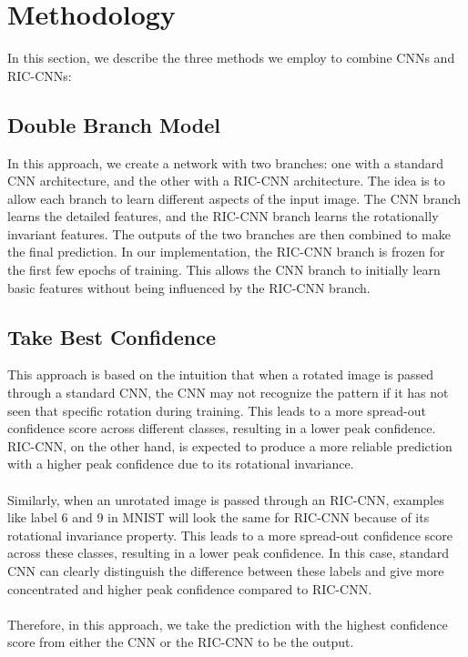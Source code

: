 \section{Methodology}
\label{sec:method}

In this section, we describe the three methods we employ to combine CNNs and RIC-CNNs:
\subsection{Double Branch Model}

In this approach, we create a network with two branches: one with a standard CNN architecture, and the other with a RIC-CNN architecture. The idea is to allow each branch to learn different aspects of the input image. The CNN branch learns the detailed features, and the RIC-CNN branch learns the rotationally invariant features. The outputs of the two branches are then combined to make the final prediction.  In our implementation, the RIC-CNN branch is frozen for the first few epochs of training. This allows the CNN branch to initially learn basic features without being influenced by the RIC-CNN branch.

\subsection{Take Best Confidence}

This approach is based on the intuition that when a rotated image is passed through a standard CNN, the CNN may not recognize the pattern if it has not seen that specific rotation during training. This leads to a more spread-out confidence score across different classes, resulting in a lower peak confidence.  RIC-CNN, on the other hand, is expected to produce a more reliable prediction with a higher peak confidence due to its rotational invariance.
\\ \\
Similarly, when an unrotated image is passed through an RIC-CNN, examples like label 6 and 9 in MNIST will look the same for RIC-CNN because of its rotational invariance property. This leads to a more spread-out confidence score across these classes, resulting in a lower peak confidence. In this case, standard CNN can clearly distinguish the difference between these labels and give more concentrated and higher peak confidence compared to RIC-CNN.
\\ \\
Therefore, in this approach, we take the prediction with the highest confidence score from either the CNN or the RIC-CNN to be the output.

